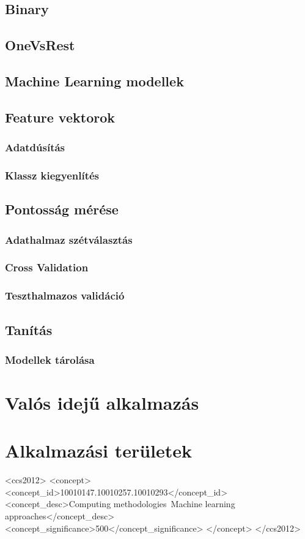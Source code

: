 \documentclass[acmtog, authorversion]{acmart}
\begin{document}
\subsection{Binary}
\subsection{OneVsRest}
\subsection{Machine Learning modellek}
\subsection{Feature vektorok}
\subsubsection{Adatdúsítás}
\subsubsection{Klassz kiegyenlítés}
\subsection{Pontosság mérése}
\subsubsection{Adathalmaz szétválasztás}
\subsubsection{Cross Validation}
\subsubsection{Teszthalmazos validáció}
\subsection{Tanítás}
\subsubsection{Modellek tárolása}

\section{Valós idejű alkalmazás}

\section{Alkalmazási területek}




\begin{CCSXML}
    <ccs2012>
        <concept>
            <concept_id>10010147.10010257.10010293</concept_id>
            <concept_desc>Computing methodologies~Machine learning approaches</concept_desc>
            <concept_significance>500</concept_significance>
            </concept>
    </ccs2012>
\end{CCSXML}
\end{document}
